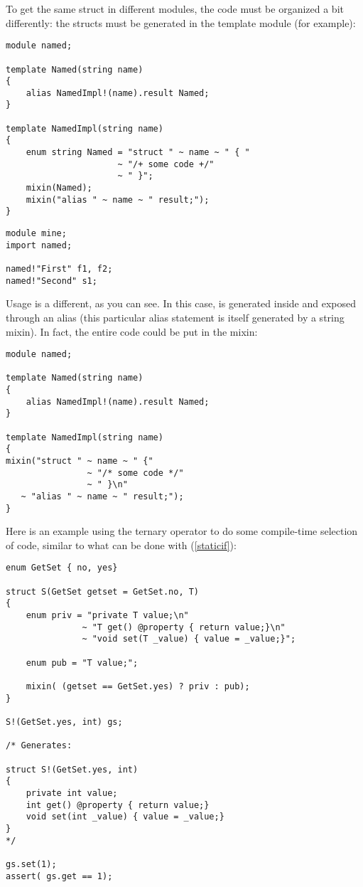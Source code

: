 To get the same struct in different modules, the code must be organized a bit differently: the structs must be generated in the template module (for example):

\begin{verbatim}
module named;

template Named(string name)
{
    alias NamedImpl!(name).result Named;
}

template NamedImpl(string name)
{    
    enum string Named = "struct " ~ name ~ " { "
                      ~ "/+ some code +/"
                      ~ " }";
    mixin(Named);
    mixin("alias " ~ name ~ " result;");
}
\end{verbatim}

\begin{verbatim}
module mine;
import named;

named!"First" f1, f2;
named!"Second" s1;
\end{verbatim}

Usage is a different, as you can see. In this case,  is generated inside  and exposed through an alias (this particular alias statement is itself generated by a string mixin). In fact, the entire code could be put in the mixin:

\begin{verbatim}
module named;

template Named(string name)
{
    alias NamedImpl!(name).result Named;
}

template NamedImpl(string name)
{
mixin("struct " ~ name ~ " {"
                ~ "/* some code */"
                ~ " }\n"
   ~ "alias " ~ name ~ " result;");
}
\end{verbatim}

Here is an example using the ternary  operator to do some compile-time selection of code, similar to what can be done with  (\ref{staticif}):

\begin{verbatim}
enum GetSet { no, yes}

struct S(GetSet getset = GetSet.no, T)
{
    enum priv = "private T value;\n"
               ~ "T get() @property { return value;}\n"
               ~ "void set(T _value) { value = _value;}";

    enum pub = "T value;";

    mixin( (getset == GetSet.yes) ? priv : pub);
}

S!(GetSet.yes, int) gs;

/* Generates:

struct S!(GetSet.yes, int)
{
    private int value;
    int get() @property { return value;}
    void set(int _value) { value = _value;}
}
*/

gs.set(1);
assert( gs.get == 1);
\end{verbatim}

